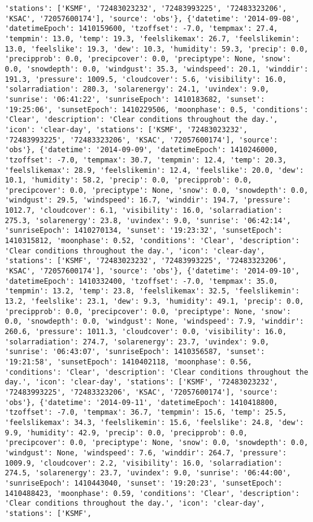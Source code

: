 \documentclass[
  letterpaper,
  DIV=11,
  numbers=noendperiod]{scrartcl}
\begin{document}
\begin{verbatim}
'stations': ['KSMF', '72483023232', '72483993225', '72483323206', 'KSAC', '72057600174'], 'source': 'obs'}, {'datetime': '2014-09-08', 'datetimeEpoch': 1410159600, 'tzoffset': -7.0, 'tempmax': 27.4, 'tempmin': 13.0, 'temp': 19.3, 'feelslikemax': 26.7, 'feelslikemin': 13.0, 'feelslike': 19.3, 'dew': 10.3, 'humidity': 59.3, 'precip': 0.0, 'precipprob': 0.0, 'precipcover': 0.0, 'preciptype': None, 'snow': 0.0, 'snowdepth': 0.0, 'windgust': 35.3, 'windspeed': 20.1, 'winddir': 191.3, 'pressure': 1009.5, 'cloudcover': 5.6, 'visibility': 16.0, 'solarradiation': 280.3, 'solarenergy': 24.1, 'uvindex': 9.0, 'sunrise': '06:41:22', 'sunriseEpoch': 1410183682, 'sunset': '19:25:06', 'sunsetEpoch': 1410229506, 'moonphase': 0.5, 'conditions': 'Clear', 'description': 'Clear conditions throughout the day.', 'icon': 'clear-day', 'stations': ['KSMF', '72483023232', '72483993225', '72483323206', 'KSAC', '72057600174'], 'source': 'obs'}, {'datetime': '2014-09-09', 'datetimeEpoch': 1410246000, 'tzoffset': -7.0, 'tempmax': 30.7, 'tempmin': 12.4, 'temp': 20.3, 'feelslikemax': 28.9, 'feelslikemin': 12.4, 'feelslike': 20.0, 'dew': 10.1, 'humidity': 58.2, 'precip': 0.0, 'precipprob': 0.0, 'precipcover': 0.0, 'preciptype': None, 'snow': 0.0, 'snowdepth': 0.0, 'windgust': 29.5, 'windspeed': 16.7, 'winddir': 194.7, 'pressure': 1012.7, 'cloudcover': 6.1, 'visibility': 16.0, 'solarradiation': 275.3, 'solarenergy': 23.8, 'uvindex': 9.0, 'sunrise': '06:42:14', 'sunriseEpoch': 1410270134, 'sunset': '19:23:32', 'sunsetEpoch': 1410315812, 'moonphase': 0.52, 'conditions': 'Clear', 'description': 'Clear conditions throughout the day.', 'icon': 'clear-day', 'stations': ['KSMF', '72483023232', '72483993225', '72483323206', 'KSAC', '72057600174'], 'source': 'obs'}, {'datetime': '2014-09-10', 'datetimeEpoch': 1410332400, 'tzoffset': -7.0, 'tempmax': 35.0, 'tempmin': 13.2, 'temp': 23.8, 'feelslikemax': 32.5, 'feelslikemin': 13.2, 'feelslike': 23.1, 'dew': 9.3, 'humidity': 49.1, 'precip': 0.0, 'precipprob': 0.0, 'precipcover': 0.0, 'preciptype': None, 'snow': 0.0, 'snowdepth': 0.0, 'windgust': None, 'windspeed': 7.9, 'winddir': 260.6, 'pressure': 1011.3, 'cloudcover': 0.0, 'visibility': 16.0, 'solarradiation': 274.7, 'solarenergy': 23.7, 'uvindex': 9.0, 'sunrise': '06:43:07', 'sunriseEpoch': 1410356587, 'sunset': '19:21:58', 'sunsetEpoch': 1410402118, 'moonphase': 0.56, 'conditions': 'Clear', 'description': 'Clear conditions throughout the day.', 'icon': 'clear-day', 'stations': ['KSMF', '72483023232', '72483993225', '72483323206', 'KSAC', '72057600174'], 'source': 'obs'}, {'datetime': '2014-09-11', 'datetimeEpoch': 1410418800, 'tzoffset': -7.0, 'tempmax': 36.7, 'tempmin': 15.6, 'temp': 25.5, 'feelslikemax': 34.3, 'feelslikemin': 15.6, 'feelslike': 24.8, 'dew': 9.9, 'humidity': 42.9, 'precip': 0.0, 'precipprob': 0.0, 'precipcover': 0.0, 'preciptype': None, 'snow': 0.0, 'snowdepth': 0.0, 'windgust': None, 'windspeed': 7.6, 'winddir': 264.7, 'pressure': 1009.9, 'cloudcover': 2.2, 'visibility': 16.0, 'solarradiation': 274.5, 'solarenergy': 23.7, 'uvindex': 9.0, 'sunrise': '06:44:00', 'sunriseEpoch': 1410443040, 'sunset': '19:20:23', 'sunsetEpoch': 1410488423, 'moonphase': 0.59, 'conditions': 'Clear', 'description': 'Clear conditions throughout the day.', 'icon': 'clear-day', 'stations': ['KSMF', 
\end{verbatim}
\end{document}
